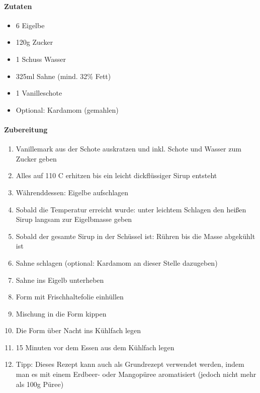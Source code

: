 \clearpage
{}
\paragraph{Zutaten}
\begin{itemize}[noitemsep]
	\item 6 Eigelbe
	\item 120g Zucker
	\item 1 Schuss Wasser 
	\item 325ml Sahne (mind. 32\% Fett)
	\item 1 Vanilleschote
	\item Optional: Kardamom (gemahlen) 
\end{itemize}

\paragraph{Zubereitung}
\begin{enumerate}[noitemsep]
	\item Vanillemark aus der Schote auskratzen und inkl. Schote und Wasser zum Zucker geben
	\item Alles auf 110 \textdegree C erhitzen bis ein leicht dickflüssiger Sirup entsteht
	\item Währenddessen: Eigelbe aufschlagen
	\item Sobald die Temperatur erreicht wurde: unter leichtem Schlagen den heißen Sirup langsam zur Eigelbmasse geben
	\item Sobald der gesamte Sirup in der Schüssel ist: Rühren bis die Masse abgekühlt ist
	\item Sahne schlagen (optional: Kardamom an dieser Stelle dazugeben)
	\item Sahne ins Eigelb unterheben
	\item Form mit Frischhaltefolie einhüllen
	\item Mischung in die Form kippen
	\item Die Form über Nacht ins Kühlfach legen
	\item 15 Minuten vor dem Essen aus dem Kühlfach legen
	\item Tipp: Dieses Rezept kann auch als Grundrezept verwendet werden, indem man es mit einem Erdbeer- oder Mangopüree aromatisiert (jedoch nicht mehr als 100g Püree)
\end{enumerate}